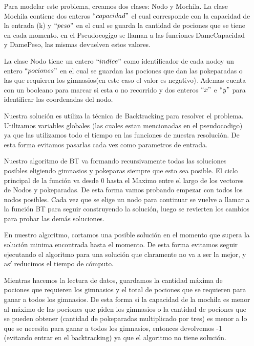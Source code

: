 \documentclass[spanish,12pt]{article}
\begin{document}
Para modelar este problema, creamos dos clases: Nodo y Mochila.
La clase Mochila contiene dos enteros $``capacidad"$ el cual corresponde con la capacidad de la entrada (k) y $``peso"$ en el cual se guarda la cantidad de pociones que se tiene en cada momento. 
en el Pseudocogigo se llaman a las funciones DameCapacidad y DamePeso, las mismas devuelven estos valores.

La clase Nodo tiene  un entero $``indice"$ como identificador de cada nodoy un entero $``pociones"$ en el cual se guardan las pociones que dan las pokeparadas o las que requieren los gimnasios(en este caso el valor es negativo). Ademas cuenta con un booleano para marcar si esta o no recorrido y dos enteros $``x"$ e $``y"$ para identificar las coordenadas del nodo.

Nuestra solución es utiliza la técnica de Backtracking para resolver el problema. Utilizamos variables globales (las cuales estan mencionadas en el pseudocodigo) ya que las utilizamos todo el tiempo en las funciones de nuestra resolución. De esta forma evitamos pasarlas cada vez como parametros de entrada.

Nuestro algoritmo de BT va formando recursivamente todas las soluciones posibles eligiendo gimnasios y pokeparas siempre que esto sea posible. El ciclo principal de la función va desde 0 hasta el Maximo entre el largo de los vectores de Nodos y pokeparadas. De esta forma vamos probando empezar con todos los nodos posibles. Cada vez que se elige un nodo para continuar se vuelve a llamar a la función BT para seguir construyendo la solución, luego se revierten los cambios para probar las demás soluciones. 

En nuestro algoritmo, cortamos una posible solución en el momento que supera la solución minima encontrada hasta el momento. De esta forma evitamos seguir ejecutando el algoritmo para una solución que claramente no va a ser la mejor, y así reducimos el tiempo de cómputo.

Mientras hacemos la lectura de datos, guardamos la cantidad máxima de pociones que requieren los gimnasios y el total de pociones que se requieren para ganar a todos los gimnasios. De esta forma si la capacidad de la mochila es menor al máximo de las pociones que piden los gimnasios o la cantidad de pociones que se pueden obtener (cantidad de pokeparadas multiplicado por tres) es menor a lo que se necesita para ganar a todos los gimnasios, entonces devolvemos -1 (evitando entrar en el backtracking) ya que el algoritmo no tiene solución. 
\end{document}
